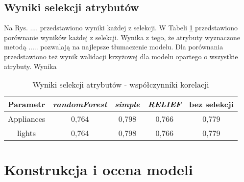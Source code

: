 \documentclass[a4paper,11pt,twoside]{mwrep}  %
\begin{document}

\section{Wyniki selekcji atrybutów}

Na Rys. .... przedstawiono wyniki każdej z selekcji. W Tabeli \ref{table:wynikiSelekcji} przedstawiono porównanie wyników każdej z selekcji. Wynika z tego, że atrybuty wyznaczone metodą ..... pozwalają na najlepsze tłumaczenie modelu. Dla porównania przedstawiono też wynik walidacji krzyżowej dla modelu opartego o wszystkie atrybuty. Wynika 

\begin{table}[!h]  \centering
\caption{Wyniki selekcji atrybutów - współczynniki korelacji}
\begin{tabular} { c  c  c  c  c } \hline \hline
    \textbf{Parametr} & \textbf{\textit{randomForest}} & \textbf{\textit{simple}} & \textbf{\textit{RELIEF}} & \textbf{bez selekcji}  \\ \hline
    Appliances & 0,764 & 0,798 & 0,766 & 0,779 \\
    lights & 0,764 & 0,798 & 0,766 & 0,779 \\
    \hline \hline
    
\end{tabular}
\label{table:wynikiSelekcji}
\end{table}

\endgroup

\begingroup
\let\clearpage\relax
\chapter{Konstrukcja i ocena modeli}
\end{document}
